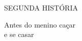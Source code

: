 



\pagebreak
\thispagestyle{empty}
\mbox{}
\begin{center}
\vspace{4cm}
{\formularlight\small SEGUNDA HISTÓRIA}

\medskip

{\formular\huge Antes do menino caçar\\\vspace{0.2cm} e se casar}
\end{center}
\pagebreak

